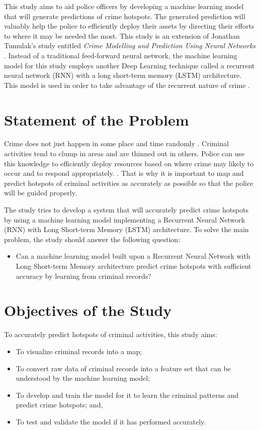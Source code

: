     This study aims to aid police officers by developing a machine learning model that will generate predictions of crime hotspots. The generated prediction will valuably help the police to efficiently deploy their assets by directing their efforts to where it may be needed the most. This study is an extension of Jonathan Tumulak's study entitled \textit{Crime Modelling and Prediction Using Neural Networks} \citeyearpar{tumulak2015crime}. Instead of a traditional feed-forward neural network, the machine learning model for this study employs another Deep Learning technique called a recurrent neural network (RNN) with a long short-term memory (LSTM) architecture. This model is used in order to take advantage of the recurrent nature of crime \citep{perc2013understanding}.

\section{Statement of the Problem} \label{section:statement-of-the-problem}
    Crime does not just happen in some place and time randomly \citep{brantingham2005modeling}. Criminal activities tend to clump in areas and are thinned out in others. Police can use this knowledge to efficiently deploy resources based on where crime may likely to occur and to respond appropriately. \citep{eck2005mapping}. That is why it is important to map and predict hotspots of criminal activities as accurately as possible so that the police will be guided properly.

    The study tries to develop a system that will accurately predict crime hotspots by using a machine learning model implementing a Recurrent Neural Network (RNN) with Long Short-term Memory (LSTM) architecture. To solve the main problem, the study should answer the following question:
        \begin{itemize}
        \item Can a machine learning model built upon a Recurrent Neural Network with Long Short-term Memory architecture predict crime hotspots with sufficient accuracy by learning from criminal records?
        \end{itemize}

\section{Objectives of the Study} \label{section:objectives-of-the-study}
    To accurately predict hotspots of criminal activities, this study aims:
        \begin{itemize}
        \item To visualize criminal records into a map;
        \item To convert raw data of criminal records into a feature set that can be understood by the machine learning model;
        \item To develop and train the model for it to learn the criminal patterns and predict crime hotspots; and,
        \item To test and validate the model if it has performed accurately.
        \end{itemize}

